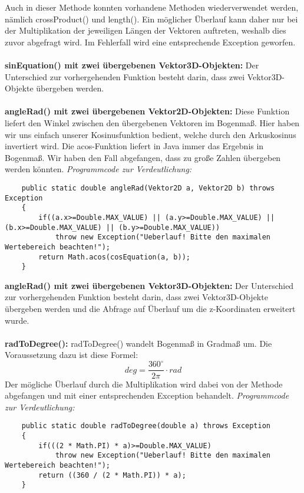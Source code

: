 \documentclass[a4paper,11pt]{scrartcl}
\begin{document}
Auch in dieser Methode konnten vorhandene Methoden wiederverwendet werden, nämlich crossProduct() und length(). Ein möglicher Überlauf kann daher nur bei der Multiplikation der jeweiligen Längen der Vektoren auftreten, weshalb dies zuvor abgefragt wird. Im Fehlerfall wird eine entsprechende Exception geworfen.\\
\\
\textbf{sinEquation() mit zwei übergebenen Vektor3D-Objekten:} Der Unterschied zur vorhergehenden Funktion besteht darin, dass zwei Vektor3D-Objekte übergeben werden.\\
\\
\textbf{angleRad() mit zwei übergebenen Vektor2D-Objekten:} Diese Funktion liefert den Winkel zwischen den übergebenen Vektoren im Bogenmaß. Hier haben wir uns einfach unserer Kosinusfunktion bedient, welche durch den Arkuskosinus invertiert wird. Die acos-Funktion liefert in Java immer das Ergebnis in Bogenmaß.
Wir haben den Fall abgefangen, dass zu große Zahlen übergeben werden könnten.
\textit{Programmcode zur Verdeutlichung:}
\begin{lstlisting}
	public static double angleRad(Vektor2D a, Vektor2D b) throws Exception
	{
		if((a.x>=Double.MAX_VALUE) || (a.y>=Double.MAX_VALUE) || (b.x>=Double.MAX_VALUE) || (b.y>=Double.MAX_VALUE))
			throw new Exception("Ueberlauf! Bitte den maximalen Wertebereich beachten!");
		return Math.acos(cosEquation(a, b));
	}
\end{lstlisting} $\;$ \\
\textbf{angleRad() mit zwei übergebenen Vektor3D-Objekten:} Der Unterschied zur vorhergehenden Funktion besteht darin, dass zwei Vektor3D-Objekte übergeben werden und die Abfrage auf Überlauf um die z-Koordinaten erweitert wurde.\\
\\
\textbf{radToDegree():} radToDegree() wandelt Bogenmaß in Gradmaß um. Die Voraussetzung dazu ist diese Formel:
\[ deg = \frac{360 ^\circ }{2\pi} \cdot rad \]
Der mögliche Überlauf durch die Multiplikation wird dabei von der Methode abgefangen und mit einer entsprechenden Exception behandelt.
\textit{Programmcode zur Verdeutlichung:}
\begin{lstlisting}
	public static double radToDegree(double a) throws Exception
	{
		if(((2 * Math.PI) * a)>=Double.MAX_VALUE)
			throw new Exception("Ueberlauf! Bitte den maximalen Wertebereich beachten!");
		return ((360 / (2 * Math.PI)) * a);
	}
\end{lstlisting} $\;$ \\
\end{document}
